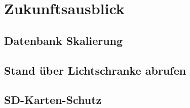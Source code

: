 
\section{Zukunftsausblick}

\subsection{Datenbank Skalierung}

\subsection{Stand über Lichtschranke abrufen}

\subsection{SD-Karten-Schutz}
